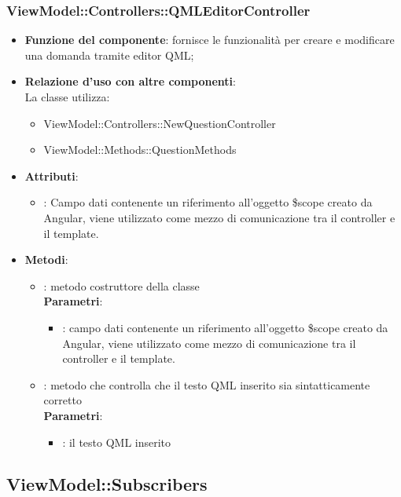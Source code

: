 \subsubsection{ViewModel::Controllers::QMLEditorController}
\begin{itemize}
\item\textbf{Funzione del componente}: fornisce le funzionalità per creare e modificare una domanda tramite editor QML;
	\item\textbf{Relazione d'uso con altre componenti}: \\
La classe utilizza:
	\begin{itemize}
		\item ViewModel::Controllers::NewQuestionController
		\item ViewModel::Methods::QuestionMethods
	\end{itemize}
\item\textbf{Attributi}:
	\begin{itemize}
		\item{}: Campo dati contenente un riferimento all’oggetto \$scope creato da Angular, viene utilizzato come mezzo di comunicazione tra il controller e il template.\\
	\end{itemize}
\item\textbf{Metodi}:
	\begin{itemize}
		\item{}: metodo costruttore della classe\\
		\textbf{Parametri}:
			\begin{itemize}
				\item{}: campo dati contenente un riferimento all’oggetto \$scope creato da Angular, viene utilizzato come mezzo di comunicazione tra il controller e il template.\\
			\end{itemize}
		\item{}: metodo che controlla che il testo QML inserito sia sintatticamente corretto\\
		\textbf{Parametri}:
			\begin{itemize}
				\item{}: il testo QML inserito\\
			\end{itemize}
	\end{itemize}
\end{itemize}


\subsection{ViewModel::Subscribers}
